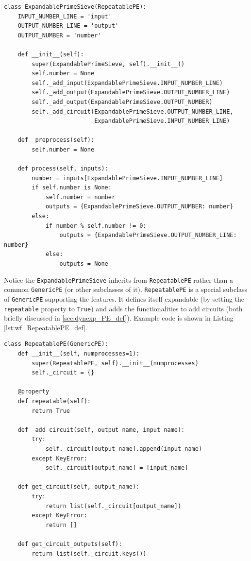 \begin{lstlisting}[frame=single,caption={Example code of the ExpandablePrimeSieve class},captionpos=b,
label={lst:wf_sieve_PE_def}
]
class ExpandablePrimeSieve(RepeatablePE):
    INPUT_NUMBER_LINE = 'input'
    OUTPUT_NUMBER_LINE = 'output'
    OUTPUT_NUMBER = 'number'

    def __init__(self):
        super(ExpandablePrimeSieve, self).__init__()
        self.number = None
        self._add_input(ExpandablePrimeSieve.INPUT_NUMBER_LINE)
        self._add_output(ExpandablePrimeSieve.OUTPUT_NUMBER_LINE)
        self._add_output(ExpandablePrimeSieve.OUTPUT_NUMBER)
        self._add_circuit(ExpandablePrimeSieve.OUTPUT_NUMBER_LINE,
                          ExpandablePrimeSieve.INPUT_NUMBER_LINE)

    def _preprocess(self):
        self.number = None

    def process(self, inputs):
        number = inputs[ExpandablePrimeSieve.INPUT_NUMBER_LINE]
        if self.number is None:
            self.number = number
            outputs = {ExpandablePrimeSieve.OUTPUT_NUMBER: number}
        else:
            if number % self.number != 0:
                outputs = {ExpandablePrimeSieve.OUTPUT_NUMBER_LINE: number}
            else:
                outputs = None
\end{lstlisting}

Notice the \lstinline|ExpandablePrimeSieve| inherits from \lstinline|RepeatablePE| rather than a common \lstinline|GenericPE| (or other subclasses of it). \lstinline|RepeatablePE| is a special subclass of \lstinline|GenericPE| supporting the \tdynexp features. It defines itself expandable (by setting the \lstinline|repeatable| property to \lstinline|True|) and adds the functionalities to add circuits (both briefly discussed in \ref{sec:dynexp_PE_def}). Example code is shown in Listing \ref{lst:wf_RepeatablePE_def}.

\begin{lstlisting}[frame=single,caption={Example code of the ExpandablePrimeSieve class},captionpos=b,
label={lst:wf_RepeatablePE_def}
]
class RepeatablePE(GenericPE):
    def __init__(self, numprocesses=1):
        super(RepeatablePE, self).__init__(numprocesses)
        self._circuit = {}

    @property
    def repeatable(self):
        return True

    def _add_circuit(self, output_name, input_name):
        try:
            self._circuit[output_name].append(input_name)
        except KeyError:
            self._circuit[output_name] = [input_name]

    def get_circuit(self, output_name):
        try:
            return list(self._circuit[output_name])
        except KeyError:
            return []

    def get_circuit_outputs(self):
        return list(self._circuit.keys())
\end{lstlisting}
